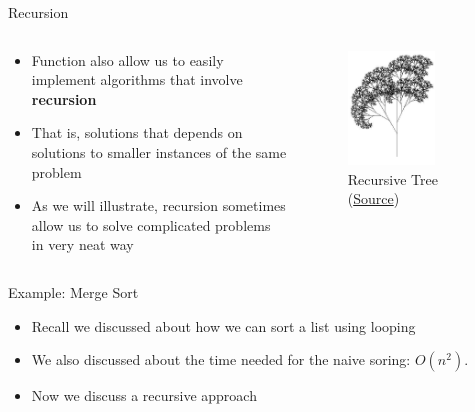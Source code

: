 \documentclass[10pt,xcolor={table,dvipsnames},t]{beamer}
\begin{document}
\begin{frame}[fragile]{Recursion}
  \begin{columns}
    \begin{column}{0.6\textwidth}
      \begin{itemize}
        \item Function also allow us to easily implement algorithms that involve \textbf{recursion}
        \item That is, solutions that depends on solutions to smaller instances of the same problem
        \item As we will illustrate, recursion sometimes allow us to solve complicated problems in very neat way
      \end{itemize}
    \end{column}
    \begin{column}[T]{0.4\textwidth}
      \begin{figure}
        
        \includegraphics[width=0.7\textwidth]{img/RecursiveTree.JPG}
        \caption{Recursive Tree (\href{https://upload.wikimedia.org/wikipedia/commons/f/f7/RecursiveTree.JPG}{Source})}
      \end{figure}
    \end{column}
  \end{columns}
\end{frame}

\begin{frame}{Example: Merge Sort}
  \begin{itemize}
    \item Recall we discussed about how we can sort a list using looping
    \item We also discussed about the time needed for the naive soring: $O(n^{2})$.
    \item Now we discuss a recursive approach
  \end{itemize}
\end{frame}
\end{document}
